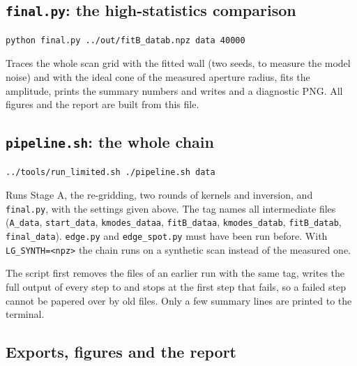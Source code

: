 \documentclass[11pt,a4paper]{article}
\newcommand{\code}[1]{\texttt{#1}}
\begin{document}
\subsection{\texttt{final.py}: the high-statistics comparison}

\begin{lstlisting}
python final.py ../out/fitB_datab.npz data 40000
\end{lstlisting}
Traces the whole scan grid with the fitted wall (two seeds, to measure the model noise) and with the
ideal cone of the measured aperture radius, fits the amplitude, prints the summary numbers and writes
 and a diagnostic PNG. All figures and the report are built from this
file.

\subsection{\texttt{pipeline.sh}: the whole chain}

\begin{lstlisting}
../tools/run_limited.sh ./pipeline.sh data
\end{lstlisting}
Runs Stage A, the re-gridding, two rounds of kernels and inversion, and \code{final.py}, with the
settings given above. The tag names all intermediate files (\code{A\_data}, \code{start\_data},
\code{kmodes\_dataa}, \code{fitB\_dataa}, \code{kmodes\_datab}, \code{fitB\_datab},
\code{final\_data}). \code{edge.py} and \code{edge\_spot.py} must have been run before. With
\code{LG\_SYNTH=<npz>} the chain runs on a synthetic scan instead of the measured one.

The script first removes the files of an earlier run with the same tag, writes the full output of
every step to  and stops at the first step that fails, so a failed
step cannot be papered over by old files. Only a few summary lines are printed to the terminal.

\subsection{Exports, figures and the report}
\end{document}
